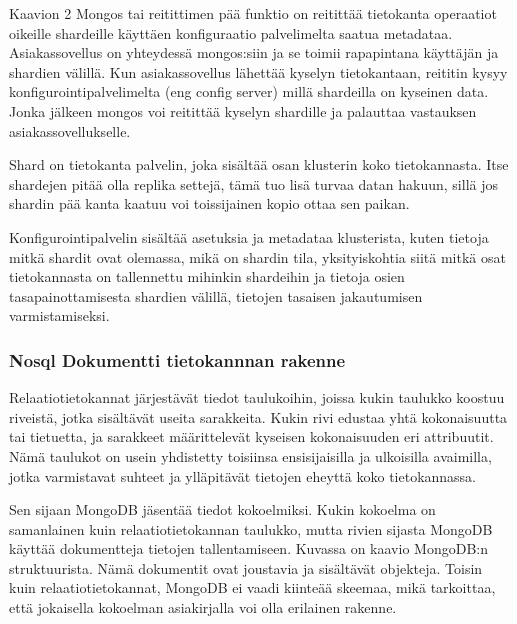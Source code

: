 

Kaavion 2 Mongos tai reitittimen pää funktio on reitittää tietokanta operaatiot oikeille shardeille käyttäen konfiguraatio palvelimelta saatua metadataa.
Asiakassovellus on yhteydessä mongos:siin ja se toimii rapapintana käyttäjän ja shardien välillä. 
Kun asiakassovellus lähettää kyselyn tietokantaan, reititin kysyy konfigurointipalvelimelta (eng config server) millä shardeilla on kyseinen data. 
Jonka jälkeen mongos voi reitittää kyselyn shardille ja palauttaa vastauksen asiakassovellukselle.
\medskip

Shard on tietokanta palvelin, joka sisältää osan klusterin koko tietokannasta.
Itse shardejen pitää olla replika settejä, 
tämä tuo lisä turvaa datan hakuun, sillä jos shardin pää kanta kaatuu voi toissijainen kopio ottaa sen paikan. 
\medskip



Konfigurointipalvelin sisältää asetuksia ja metadataa klusterista, 
kuten tietoja mitkä shardit ovat olemassa, mikä on shardin tila,
yksityiskohtia siitä mitkä osat tietokannasta on tallennettu mihinkin shardeihin
ja tietoja osien tasapainottamisesta shardien välillä, tietojen tasaisen jakautumisen varmistamiseksi.






\subsubsection{Nosql Dokumentti tietokannnan rakenne}




Relaatiotietokannat järjestävät tiedot taulukoihin,
joissa kukin taulukko koostuu riveistä, jotka sisältävät useita sarakkeita.
Kukin rivi edustaa yhtä kokonaisuutta tai tietuetta, ja sarakkeet määrittelevät kyseisen kokonaisuuden eri attribuutit.
Nämä taulukot on usein yhdistetty toisiinsa ensisijaisilla ja ulkoisilla avaimilla,
jotka varmistavat suhteet ja ylläpitävät tietojen eheyttä koko tietokannassa.
\medskip

Sen sijaan MongoDB jäsentää tiedot kokoelmiksi.
Kukin kokoelma on samanlainen kuin relaatiotietokannan taulukko,
mutta rivien sijasta MongoDB käyttää dokumentteja tietojen tallentamiseen.
Kuvassa \nextImageCount{} on kaavio MongoDB:n struktuurista. 
Nämä dokumentit ovat joustavia ja sisältävät objekteja.
Toisin kuin relaatiotietokannat, MongoDB ei vaadi kiinteää skeemaa, mikä tarkoittaa, 
että jokaisella kokoelman asiakirjalla voi olla erilainen rakenne.
\medskip

